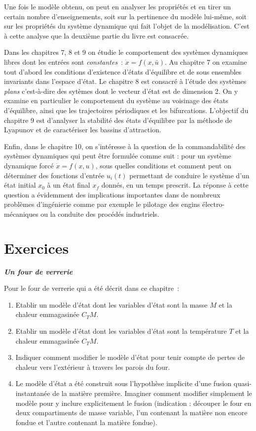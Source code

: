 Une fois le modèle obtenu, on peut en analyser les propriétés et en tirer un certain nombre
d'enseignements, soit sur la pertinence du modèle lui-même, soit sur les
propriétés du système dynamique qui fait l'objet de la
modélisation. C'est à cette analyse que la deuxième partie du livre est consacrée. 

Dans les chapitres 7, 8 et 9 on étudie le comportement des systèmes dynamiques libres dont les entrées sont {\it constantes}~: $\dot x= f(x,\bar u)$. Au chapitre 7 on examine tout d'abord les conditions  
d'existence d'états d'équilibre et de sous ensembles invariants dans l'espace d'état. Le chapitre 8 est consacré à l'étude des systèmes {\it plans} c'est-à-dire des sytèmes dont le vecteur d'état est de dimension 2. On y examine en particulier le comportement du système au voisinage des états d'équilibre, ainsi que les trajectoires périodiques et les bifurcations. L'objectif du chapitre 9 est d'analyser la stabilité des états d'équilibre par la méthode de Lyapunov et de caractériser les bassins d'attraction.

Enfin, dans le chapitre 10, on s'intéresse à la question de la commandabilité des systèmes dynamiques qui peut être formulée comme suit : pour un système dynamique forcé $\dot x = f(x,u)$, sous quelles conditions et comment peut on déterminer des fonctions d'entrée $u_i(t)$ permettant de conduire le système d'un état initial $x_0$ à un état final $x_f$ donnés, en un temps prescrit. La réponse à cette question a évidemment des implications importantes dans de nombreux problèmes d'ingénierie comme par exemple le pilotage des engins électro-mécaniques ou la conduite des procédés industriels.

\section{Exercices}

\begin{exercice} {\bf \em Un four de verrerie}

Pour le four de verrerie qui a été décrit dans ce chapitre~:
\begin{enumerate}
\item Etablir un modèle d'état dont les variables d'état sont la masse $M$ et la chaleur emmagasinée $C_TM$.
\item  Etablir un modèle d'état dont les variables d'état sont la température $T$ et la chaleur emmagasinée $C_TM$.
\item Indiquer comment modifier le modèle d'état pour tenir compte de pertes de chaleur vers l'extérieur à travers les parois du four.
\item Le modèle d'état a été construit sous l'hypothèse implicite d'une fusion quasi-instantanée de la matière première. Imaginer comment modifier simplement le modèle pour y inclure explicitement le fusion (indication : découper le four en deux compartiments de masse variable, l'un contenant la matière non encore fondue et l'autre contenant la matière fondue).
\end{enumerate}
\end{exercice}

